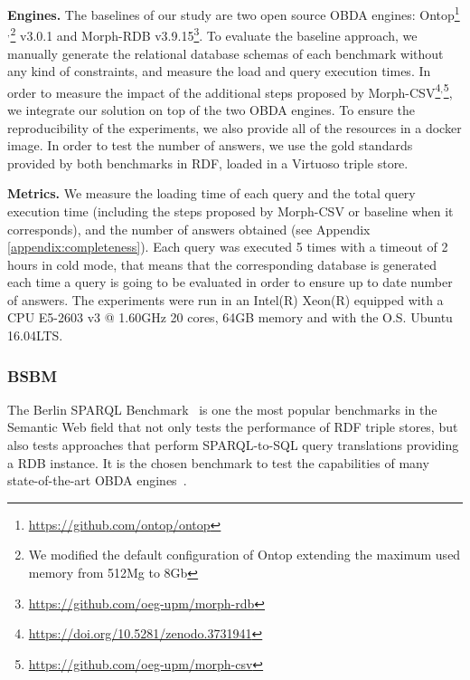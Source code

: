\noindent\textbf{Engines.} The baselines of our study are two open source OBDA engines: Ontop\footnote{\url{https://github.com/ontop/ontop}}$^,$\footnote{We modified the default configuration of Ontop extending the maximum used memory from 512Mg to 8Gb} v3.0.1 and Morph-RDB v3.9.15\footnote{\url{https://github.com/oeg-upm/morph-rdb}}. To evaluate the baseline approach, we manually generate the relational database schemas of each benchmark without any kind of constraints, and measure the load and query execution times. In order to measure the impact of the additional steps proposed by Morph-CSV\footnote{\url{https://doi.org/10.5281/zenodo.3731941}}$^,$\footnote{\url{https://github.com/oeg-upm/morph-csv}}, we integrate our solution on top of the two OBDA engines. To ensure the reproducibility of the experiments, we also provide all of the resources in a docker image. In order to test the number of  answers, we use the gold standards provided by both benchmarks in RDF, loaded in a Virtuoso triple store.

\noindent\textbf{Metrics.} We measure the loading time of each query and the total query execution time (including the steps proposed by Morph-CSV or baseline when it corresponds), and the number of answers obtained (see Appendix \ref{appendix:completeness}). Each query was executed 5 times with a timeout of 2 hours in cold mode, that means that the corresponding database is generated each time a query is going to be evaluated in order to ensure up to date number of answers. The experiments were run in an Intel(R) Xeon(R) equipped with a CPU E5-2603 v3 @ 1.60GHz 20 cores, 64GB memory and with the O.S. Ubuntu 16.04LTS.


\subsubsection{BSBM}
The Berlin SPARQL Benchmark~\cite{bizer2009berlin} is one the most popular benchmarks in the Semantic Web field that not only tests the performance of RDF triple stores, but also tests approaches that perform SPARQL-to-SQL query translations providing a RDB instance. It is the chosen benchmark to test the capabilities of many state-of-the-art OBDA engines~\cite{priyatna2014formalisation,calvanese2017ontop,mami2019squerall}. 
 
